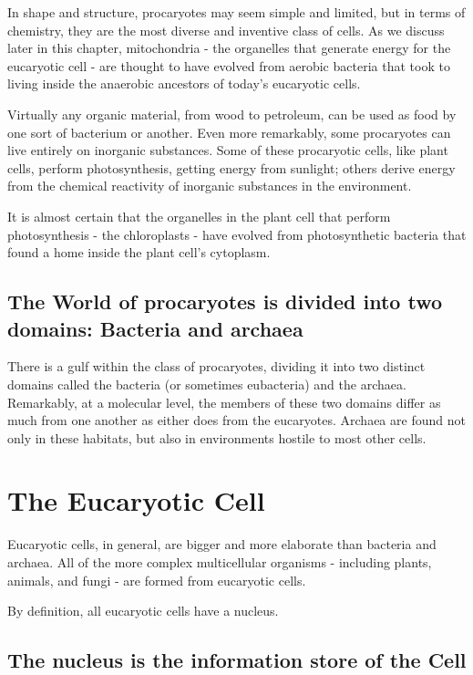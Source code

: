 In shape and structure, procaryotes may seem simple and limited,
but in terms of chemistry, they are the most diverse and inventive class
of cells.
As we discuss later in this chapter, mitochondria - the organelles that
generate energy for the eucaryotic cell - are thought to have evolved from
aerobic bacteria that took to living inside the anaerobic ancestors of
today’s eucaryotic cells.

Virtually any organic material, from wood to petroleum, can be used as
food by one sort of bacterium or another. Even more remarkably, some
procaryotes can live entirely on inorganic substances.
Some of these procaryotic cells, like plant cells, perform photosynthesis,
getting energy from sunlight; others derive energy from the chemical
reactivity of inorganic substances in the environment.

It is almost certain that the organelles in the plant cell that
perform photosynthesis - the chloroplasts - have evolved from photosynthetic
bacteria that found a home inside the plant cell’s cytoplasm.

\subsection{The World of procaryotes is divided into two domains: Bacteria and archaea}

There is a gulf within the class of procaryotes, dividing it into two distinct
domains called the bacteria (or sometimes eubacteria) and the archaea.
Remarkably, at a molecular level, the members of these two domains differ as
much from one another as either does from the eucaryotes.
Archaea are found not only in these habitats, but also
in environments hostile to most other cells.

\section{The Eucaryotic Cell}

Eucaryotic cells, in general, are bigger and more elaborate than bacteria
and archaea. All of the more complex multicellular organisms - including
plants, animals, and fungi - are formed from eucaryotic cells.

By definition, all eucaryotic cells have a nucleus.

\subsection{The nucleus is the information store of the Cell}

